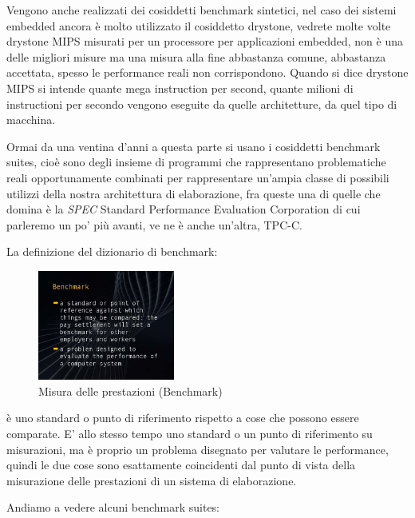 Vengono anche realizzati dei cosiddetti benchmark sintetici, nel caso dei sistemi embedded ancora è molto utilizzato il cosiddetto drystone, vedrete molte volte drystone MIPS misurati per un processore per applicazioni embedded, non è una delle migliori misure ma una misura alla fine abbastanza comune, abbastanza accettata, spesso le performance reali non corrispondono.
Quando si dice drystone MIPS si intende quante mega instruction per second, quante milioni di instructioni per secondo vengono eseguite da quelle architetture, da quel tipo di macchina.

Ormai da una ventina d'anni a questa parte si usano i cosiddetti benchmark suites, cioè sono degli insieme di programmi che rappresentano problematiche reali opportunamente combinati per rappresentare un'ampia classe di possibili utilizzi della nostra architettura di elaborazione, fra queste una di quelle che domina è la \textit{SPEC} Standard Performance Evaluation Corporation di cui parleremo un po' più avanti, ve ne è anche un'altra, TPC-C.

La definizione del dizionario di benchmark:

\FloatBarrier
\begin{figure}[H]
  \centering
  \includegraphics[width=0.40\textwidth,
                    trim=40 40 10 40, %
                    clip]
                    {images/Lez03_p03_fig_06.png}
  \caption{Misura delle prestazioni (Benchmark)}
  \label{fig:Lez03_p03_fig_06}
\end{figure}
\FloatBarrier
\noindent

è uno standard o punto di riferimento rispetto a cose che possono essere comparate.
E' allo stesso tempo uno standard o un punto di riferimento su misurazioni, ma è proprio un problema disegnato per valutare le performance, quindi le due cose sono esattamente coincidenti dal punto di vista della misurazione delle prestazioni di un sistema di elaborazione.

Andiamo a vedere alcuni benchmark suites:

